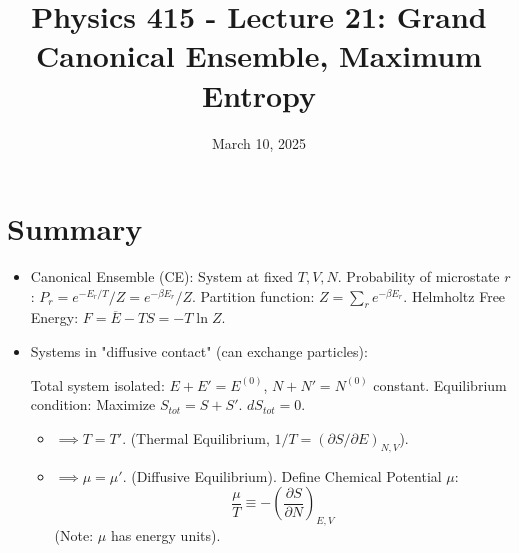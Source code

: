 \documentclass[11pt]{article}
\title{Physics 415 - Lecture 21: Grand Canonical Ensemble, Maximum Entropy}
\date{March 10, 2025}
\author{} %
\newcommand{\avg}[1]{\overline{#1}}
\newcommand{\pderiv}[2]{\frac{\partial #1}{\partial #2}}
\newcommand{\partfn}{Z} %
\begin{document}
\maketitle
\thispagestyle{empty}

\section*{Summary}

\begin{itemize}
    \item Canonical Ensemble (CE): System at fixed $T, V, N$.
    Probability of microstate $r$: $P_r = e^{-E_r/T} / \partfn = e^{-\beta E_r} / \partfn$.
    Partition function: $\partfn = \sum_r e^{-\beta E_r}$.
    Helmholtz Free Energy: $F = \avg{E} - TS = -T \ln \partfn$.
    \item Systems in "diffusive contact" (can exchange particles):
    \begin{center}
    \end{center}
    Total system isolated: $E+E'=E^{(0)}$, $N+N'=N^{(0)}$ constant.
    Equilibrium condition: Maximize $S_{tot} = S + S'$. $dS_{tot}=0$.
    \begin{itemize}
        \item $\implies T = T'$. (Thermal Equilibrium, $1/T = (\partial S / \partial E)_{N,V}$).
        \item $\implies \mu = \mu'$. (Diffusive Equilibrium). Define Chemical Potential $\mu$:
        \[ \frac{\mu}{T} \equiv - \left( \pderiv{S}{N} \right)_{E,V} \]
        (Note: $\mu$ has energy units).
    \end{itemize}
\end{itemize}
\end{document}

